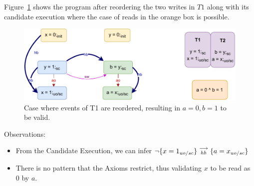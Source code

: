         Figure~\ref{reord_counter:example4(b)} shows the program after reordering the two writes in $T1$ along with its candidate execution where the case of reads in the orange box is possible. 
        \begin{figure}[H]
            \centering
            \includegraphics[scale=0.7]{5.InstructionReordering/4.ValidReorderingCandidate/Example7R(Wuo,sc-Wsc).pdf}
            \caption{Case where events of T1 are reordered, resulting in $a = 0,  b = 1$ to be valid.}
            \label{reord_counter:example4(b)}
        \end{figure}
        
        Observations:
        \begin{itemize}
            \item From the Candidate Execution, we can infer $\neg\{x=1_{uo/sc}\}\stackrel{\longrightarrow}{_{hb}}\{a=x_{uo/sc}\}$
            \item There is no pattern that the Axioms restrict, thus validating $x$ to be read as $0$ by $a$. 
        \end{itemize}